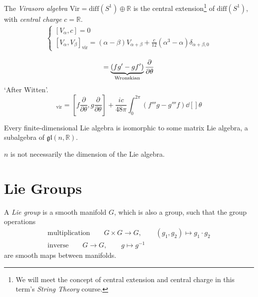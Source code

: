 \begin{example}
  The \emph{Virasoro algebra} $\text{Vir} = \text{diff}(S^1) \oplus \mathbb{R}$ is the central extension\footnote{We will meet the concept of central extension and central charge in this term's \emph{String Theory} course.} of $\text{diff}(S^1)$, with \emph{central charge} $c = \mathbb{R}$.
  \begin{align}
    \left\{
    \begin{gathered}
      [V_{\alpha}, c] = 0 \\
      [V_{\alpha}, V_{\beta}]_{\text{vir}} = (\alpha - \beta) V_{\alpha + \beta} + \frac{c}{12} (\alpha^3 - \alpha) \delta_{\alpha + \beta, 0}
    \end{gathered}
    \right.
  \end{align}
  \begin{remark}
    \begin{equation}
      [f(\theta) \frac{\partial }{\partial \theta}, g(\theta) \frac{\partial }{\partial \theta}] = \underbrace{(f g' - g f')}_{\mathclap{\text{Wronskian}}} \frac{\partial }{\partial \theta}
    \end{equation}
    `After Witten'.
    \begin{equation}
      [f \frac{\partial }{\partial \theta}, g \frac{\partial }{\partial \theta}]_{\text{vir}} = [f \frac{\partial }{\partial \theta}, g \frac{\partial }{\partial \theta}] + \frac{i c}{48 \pi} \int_0^{2 \pi} (f''' g - g''' f) \dd[]{\theta}
    \end{equation}
  \end{remark}
\end{example}

\begin{theorem}[Ado]
  Every finite-dimensional Lie algebra is isomorphic to some matrix Lie algebra, a subalgebra of $\mathfrak{gl}(n, \mathbb{R})$.
\end{theorem}
\begin{leftbar}
  \begin{remark}
    $n$ is not necessarily the dimension of the Lie algebra.
  \end{remark}
\end{leftbar}

\chapter{Lie Groups}%
\label{cha:lie_groups}

\begin{definition}
  A \emph{Lie group} is a smooth manifold $G$, which is also a group, such that the group operations
  \begin{gather}
    \text{multiplication} \qquad G \times G \to G, \qquad (g_1, g_2) \mapsto g_1 \cdot g_2 \\
    \text{inverse} \qquad G \to G, \qquad g \mapsto g^{-1}
  \end{gather}
  are smooth maps between manifolds.
\end{definition}

